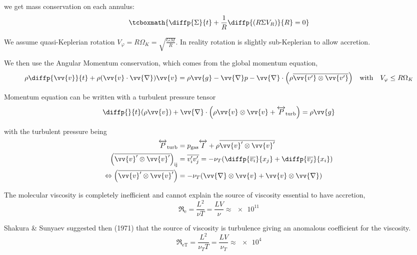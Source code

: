 \documentclass[10pt,a4paper,english]{article}
\let\originalleft\left
\let\originalright\right
\renewcommand{\left}{\mathopen{}\mathclose\bgroup\originalleft}
\renewcommand{\right}{\aftergroup\egroup\originalright}
\begin{document}
we get mass conservation on each annulus:
\begin{equation}
    \label{eq:alpha_mass}
    \tcboxmath{
        \diffp{\Sigma}{t} + \frac{1}{R} \diffp{(R \Sigma V_R)}{R} = 0
    }
\end{equation}

We assume quasi-Keplerian rotation $V_\varphi = R \Omega_K = \sqrt{\frac{G
M}{R}}$. In reality rotation is slightly sub-Keplerian to allow accretion.

We then use the Angular Momentum conservation, which comes from the global
momentum equation,
\begin{equation*}
    \rho \diffp{\vv{v}}{t} + \rho (\vv{v}\cdot\vv{\nabla})\vv{v} =
    \rho \vv{g} - \vv{\nabla} p - \vv{\nabla}\cdot\left(\rho \overline{\vv{v'} \otimes \vv{v'}}\right) \quad \text{with} \quad V_\varphi \leq R \Omega_K
\end{equation*}

Momentum equation can be written with a turbulent pressure tensor
\begin{equation*}
    \diffp{}{t}(\rho \vv{v}) + \vv{\nabla}\cdot\left(\rho \vv{v} \otimes \vv{v} + \tens{P}_\mathrm{turb}\right) = \rho \vv{g}
\end{equation*}


with the turbulent pressure being
\begin{align*}
    \tens{P}_\mathrm{turb} &= p_\mathrm{gas} \tens{I} + \rho \overline{\vv{v}' \otimes \vv{v}'} \\
    \left(\overline{\vv{v}' \otimes \vv{v}'}\right)_\mathrm{ij} &= \overline{v_i' v_j'} =
    - \nu_T \left( \diffp{\overline{v_i}}{{x_j}} + \diffp{\overline{v_j}}{{x_i}} \right) \\
    \Leftrightarrow \left(\overline{\vv{v}' \otimes \vv{v}'}\right) &=
    - \nu_T \left(\vv{\nabla} \otimes \vv{v} + \vv{v} \otimes \vv{\nabla}\right)
\end{align*}


The molecular viscosity is completely inefficient and cannot explain the source
of viscosity essential to have accretion,
\begin{equation*}
    \mathfrak{R}_\mathrm{e} = \frac{L^2}{\nu T} = \frac{L V}{\nu} \approx \num{e11}
\end{equation*}

Shakura \& Sunyaev suggested then (1971) that the source of viscosity is
turbulence giving an anomalous coefficient for the viscosity.
\begin{equation*}
    \mathfrak{R}_\mathrm{eT} = \frac{L^2}{\nu_T T} = \frac{L V}{\nu_T} \approx \num{e4}
\end{equation*}
\end{document}
